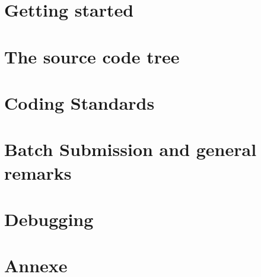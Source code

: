 \documentclass[11pt,a4paper]{report}
\begin{document}
%
%
\chapter{Getting started}
\label{ch:start}



%
%
\chapter{The source code tree}
\label{ch:tree}



%
%
\chapter{Coding Standards}
\label{ch:CS}


%
%
\chapter{Batch Submission and general remarks}
\label{ch:Batch}


%
\chapter{Debugging}
\label{ch:Debug}



%
%
\chapter{Annexe}
\label{ch:Annexe}




\
\end{document}
